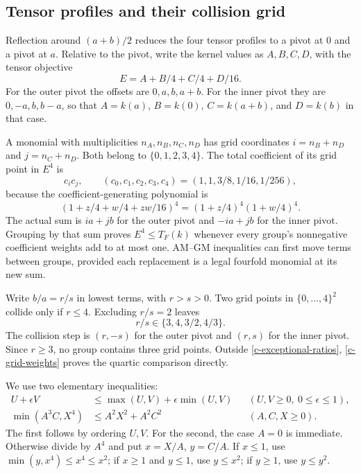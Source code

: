 \subsection{Tensor profiles and their collision grid}

Reflection around $(a+b)/2$ reduces the four tensor profiles to a pivot at
$0$ and a pivot at $a$.  Relative to the pivot, write the kernel values
as $A,B,C,D$, with the tensor objective
\[
 E=A+B/4+C/4+D/16.
\]
For the outer pivot the offsets are $0,a,b,a+b$.  For the inner pivot
they are $0,-a,b,b-a$, so that $A=k(a)$, $B=k(0)$, $C=k(a+b)$, and
$D=k(b)$ in that case.

A monomial with multiplicities $n_A,n_B,n_C,n_D$ has grid coordinates
$i=n_B+n_D$ and $j=n_C+n_D$.  Both belong to $\{0,1,2,3,4\}$.
The total coefficient of its grid point in $E^4$ is
\begin{equation}\label{c-grid-weights}
 c_ic_j,\qquad (c_0,c_1,c_2,c_3,c_4)=(1,1,3/8,1/16,1/256),
\end{equation}
because the coefficient-generating polynomial is
\[
 (1+z/4+w/4+zw/16)^4=(1+z/4)^4(1+w/4)^4.
\]
The actual sum is $ia+jb$ for the outer pivot and $-ia+jb$ for the inner
pivot.  Grouping by that sum proves $E^4\le T_F(k)$ whenever every
group's nonnegative coefficient weights add to at most one.  AM--GM
inequalities can first move terms between groups, provided each replacement
is a legal fourfold monomial at its new sum.

Write $b/a=r/s$ in lowest terms, with $r>s>0$.  Two grid points in
$\{0,\ldots,4\}^2$ collide only if $r\le4$.  Excluding $r/s=2$ leaves
\begin{equation}\label{c-exceptional-ratios}
 r/s\in\{3,4,3/2,4/3\}.
\end{equation}
The collision step is $(r,-s)$ for the outer pivot and $(r,s)$ for the
inner pivot.  Since $r\ge3$, no group contains three grid points.
Outside \eqref{c-exceptional-ratios}, \eqref{c-grid-weights} proves the
quartic comparison directly.

We use two elementary inequalities:
\begin{align}
 U+\epsilon V&\le\max(U,V)+\epsilon\min(U,V)
     &&(U,V\ge0,\ 0\le\epsilon\le1),\label{c-max-min}\\
 \min(A^3C,X^4)&\le A^2X^2+A^2C^2
     &&(A,C,X\ge0).\label{c-absorption}
\end{align}
The first follows by ordering $U,V$.  For the second, the case $A=0$
is immediate.  Otherwise divide by $A^4$ and put $x=X/A$, $y=C/A$.
If $x\le1$, use $\min(y,x^4)\le x^4\le x^2$; if $x\ge1$ and
$y\le1$, use $y\le x^2$; if $y\ge1$, use $y\le y^2$.

